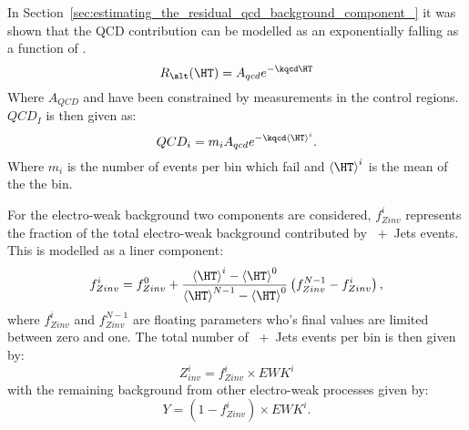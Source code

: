 In Section~\ref{sec:estimating_the_residual_qcd_background_component_} it was 
shown that the QCD contribution can be modelled as an exponentially falling as 
a function of \HT.
\begin{equation}
  R_{\alt}(\HT) = A_{qcd}e^{-\kqcd \HT}
\end{equation}
Where $A_{QCD}$ and \kqcd have been constrained by measurements in the control regions. $QCD_{I}$ is then given as:
\begin{equation}
  QCD_{i} = m_{i}A_{qcd}e^{-\kqcd \left<\HT\right>^{i}}.
  \label{eqn:qcdi}
\end{equation}
Where $m_{i}$ is the number of events per \HT bin which fail \altg and $\left<\HT\right>^{i}$ is the mean \HT of the the bin.


For the electro-weak background two components are considered, $f^{i}_{Zinv}$ represents the fraction of the total electro-weak background contributed by \HepProcess{\PZ\to\Pnu\Pnu}~+~Jets events. This is modelled as a liner component:
\begin{equation}
  f^{i}_{Zinv} = f^{0}_{Zinv}+\frac{\left<\HT\right>^{i}-\left<\HT\right>^{0}}{\left<\HT\right>^{N-1}-\left<\HT\right>^{0}}\left(f^{N-1}_{Zinv}-f^{i}_{Zinv}\right),
\end{equation}
where $f^{i}_{Zinv}$ and $f^{N-1}_{Zinv}$ are floating parameters who's final values are limited between zero and one. The total number of \HepProcess{\PZ\to\Pnu\Pnu}~+~Jets events per bin is then given by:
\begin{equation}
  Z^{i}_{inv} = f^{i}_{Zinv} \times EWK^{i}
  \label{eq:fzinv}
\end{equation}
with the remaining background from other electro-weak processes given by:
\begin{equation}
  Y=\left(1-f^{i}_{Zinv}\right)\times EWK^{i}.
  \label{eq:noZinv}
\end{equation}

